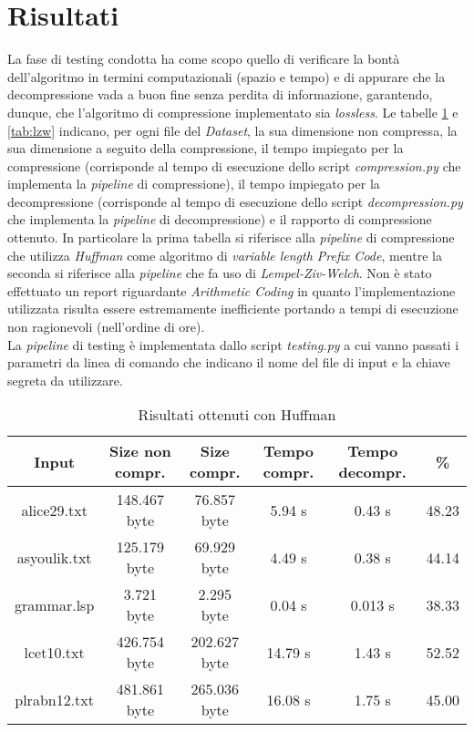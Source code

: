 \section{Risultati}\label{section:risultati}
La fase di testing condotta ha come scopo quello di verificare la bontà dell'algoritmo in termini computazionali (spazio e tempo) e di appurare che la decompressione vada a buon fine senza perdita di informazione, garantendo, dunque, che l'algoritmo di compressione implementato sia \emph{lossless}. Le tabelle \ref{tab:huffman} e \ref{tab:lzw} indicano, per ogni file del \emph{Dataset}, la sua dimensione non compressa, la sua dimensione a seguito della compressione, il tempo impiegato per la compressione (corrisponde al tempo di esecuzione dello script \emph{compression.py} che implementa la \emph{pipeline} di compressione), il tempo impiegato per la decompressione (corrisponde al tempo di esecuzione dello script \emph{decompression.py} che implementa la \emph{pipeline} di decompressione) e il rapporto di compressione ottenuto. In particolare la prima tabella si riferisce alla \emph{pipeline} di compressione che utilizza \emph{Huffman} come algoritmo di \emph{variable length Prefix Code}, mentre la seconda si riferisce alla \emph{pipeline} che fa uso di \emph{Lempel-Ziv-Welch}. Non è stato effettuato un report riguardante \emph{Arithmetic Coding} in quanto l'implementazione utilizzata risulta essere estremamente inefficiente portando a tempi di esecuzione non ragionevoli (nell'ordine di ore). \\ La \emph{pipeline} di testing è implementata dallo script \emph{testing.py} a cui vanno passati i parametri da linea di comando che indicano il nome del file di input e la chiave segreta da utilizzare.
    \begin{table}
    \begin{tabular}{||c c c c c c||} 
     \hline
     Input & Size non compr. & Size compr. & Tempo compr. & Tempo decompr. & \% \\ [0.5ex] 
     \hline\hline
     alice29.txt & 148.467 byte & 76.857 byte & 5.94 s & 0.43 s & 48.23\\ 
     \hline
     asyoulik.txt & 125.179 byte & 69.929 byte & 4.49 s & 0.38 s & 44.14\\
     \hline
     grammar.lsp & 3.721 byte & 2.295 byte & 0.04 s & 0.013 s & 38.33\\
     \hline
     lcet10.txt & 426.754 byte & 202.627 byte & 14.79 s & 1.43 s & 52.52\\
     \hline
     plrabn12.txt & 481.861 byte & 265.036 byte & 16.08 s & 1.75 s & 45.00\\ [1ex] 
     \hline
    \end{tabular} 
    \caption{Risultati ottenuti con Huffman\label{tab:huffman}}
    \end{table}
